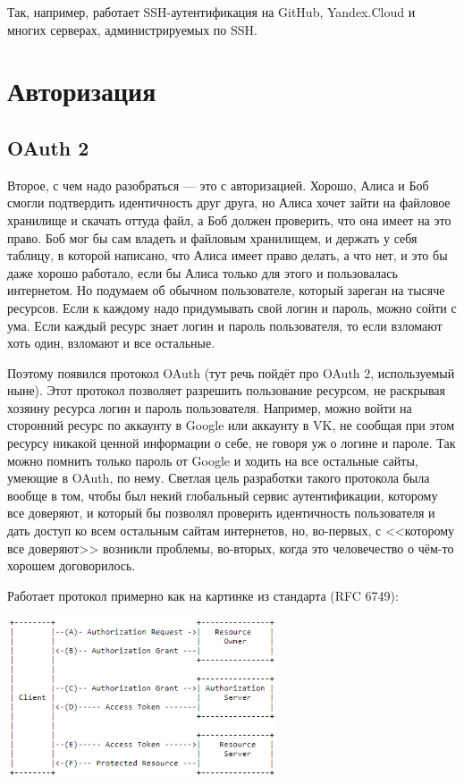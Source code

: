 \documentclass{../../text-style}
\begin{document}
Так, например, работает SSH-аутентификация на GitHub, Yandex.Cloud и многих серверах, администрируемых по SSH.

\section{Авторизация}

\subsection{OAuth 2}

Второе, с чем надо разобраться --- это с авторизацией. Хорошо, Алиса и Боб смогли подтвердить идентичность друг друга, но Алиса хочет зайти на файловое хранилище и скачать оттуда файл, а Боб должен проверить, что она имеет на это право. Боб мог бы сам владеть и файловым хранилищем, и держать у себя таблицу, в которой написано, что Алиса имеет право делать, а что нет, и это бы даже хорошо работало, если бы Алиса только для этого и пользовалась интернетом. Но подумаем об обычном пользователе, который зареган на тысяче ресурсов. Если к каждому надо придумывать свой логин и пароль, можно сойти с ума. Если каждый ресурс знает логин и пароль пользователя, то если взломают хоть один, взломают и все остальные.

Поэтому появился протокол OAuth (тут речь пойдёт про OAuth 2, используемый ныне). Этот протокол позволяет разрешить пользование ресурсом, не раскрывая хозяину ресурса логин и пароль пользователя. Например, можно войти на сторонний ресурс по аккаунту в Google или аккаунту в VK, не сообщая при этом ресурсу никакой ценной информации о себе, не говоря уж о логине и пароле. Так можно помнить только пароль от Google и ходить на все остальные сайты, умеющие в OAuth, по нему. Светлая цель разработки такого протокола была вообще в том, чтобы был некий глобальный сервис аутентификации, которому все доверяют, и который бы позволял проверить идентичность пользователя и дать доступ ко всем остальным сайтам интернетов, но, во-первых, с <<которому все доверяют>> возникли проблемы, во-вторых, когда это человечество о чём-то хорошем договорилось.

Работает протокол примерно как на картинке из стандарта (RFC 6749):

\begin{center}
    \includegraphics[width=0.6\textwidth]{oauth.png}
\end{center}
\end{document}
